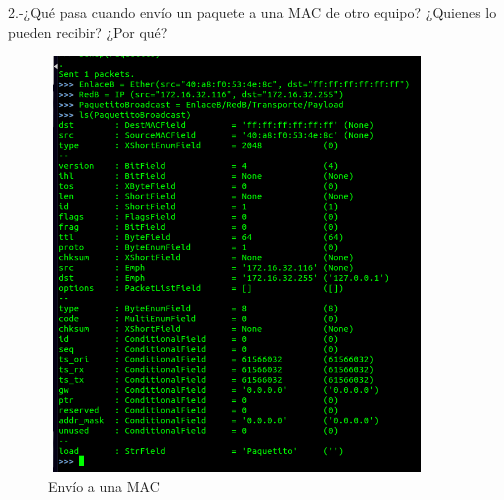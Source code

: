 \documentclass{udpreport}
\begin{document}
  	  2.-¿Qué pasa cuando envío un paquete a una MAC de otro equipo? ¿Quienes lo
  	      pueden recibir? ¿Por qué?\\
    		\begin{figure}[H]
  	        	\centering
  	          	\includegraphics[width=10cm, height=11cm]{EnvioPaquetitoMalo2.png}
  	          	\caption{Envío a una MAC}
  		\end{figure}
 	      
\end{document}
